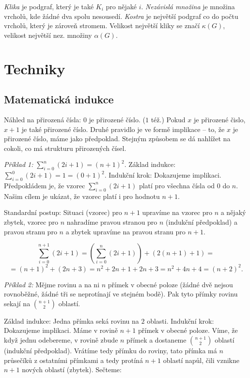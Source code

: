 {\it Klika} je podgraf, který je také $K_i$ pro nějaké $i$. {\it Nezávislá množina}
je množina vrcholů, kde žádné dva spolu nesousedí. {\it Kostra} je největší podgraf co
do počtu vrcholů, který je zároveň stromem. Velikost největší kliky se značí
$\kappa(G)$, velikost největší nez. množiny $\alpha(G)$.


\section{Techniky}

\subsection{Matematická indukce}

Náhled na přirozená čísla:
\itemize\ibull
\: $0$ je přirozené číslo. ($1$ též.)
\: Pokud $x$ je přirozené čislo, $x+1$ je také přirozené číslo.
\endlist
Druhé pravidlo je ve formě implikace -- to, že $x$ je přirozené číslo,
máme  jako předpoklad. Stejným způsobem se dá nahlížet na
cokoli, co má  strukturu přirozených čísel.

{\it Příklad 1:} $\sum_{i=0}^n (2i+1) = (n+1)^2$.
\itemize\ibull
\: Základ indukce: $\sum_{i=0}^0 (2i+1) = 1 = (0+1)^2$.
\: Indukční krok: Dokazujeme implikaci. Předpokládem je, že vzorec $\sum_{i=0}^n (2i+1)$ platí pro všechna čísla od $0$ do $n$. Našim cílem je ukázat, že vzorec platí i pro hodnotu $n+1$.

Standardní postup: Situaci (vzorec) pro $n+1$ upravíme na vzorec pro $n$ a nějaký zbytek,
vzorec pro $n$ nahradíme pravou stranou pro $n$ (indukční předpoklad) a pravou stranu pro $n$
a zbytek upravíme na pravou stranu pro $n+1$. 
\endlist

$$ \sum_{i=0}^{n+1} (2i+1) = \left( \sum_{i=0}^n (2i+1) \right) + \left(2(n+1)+1\right) = $$
$$ = (n+1)^2 + (2n+3) = n^2 + 2n +1 + 2n + 3 = n^2 + 4n + 4 = (n+2)^2. $$

{\it Příklad 2:} Mějme rovinu a na ni $n$ přímek v obecné poloze
(žádné dvě nejsou rovnoběžné, žádné tři se neprotínají ve stejném
bodě). Pak tyto přímky rovinu sekají na ${n+1 \choose 2}$ oblastí.

\itemize\ibull
\: Základ indukce: Jedna přímka seká rovinu na $2$ oblasti.
\: Indukční krok: Dokazujeme implikaci. Máme v rovině $n+1$ přímek v
obecné poloze. Víme, že když jednu odebereme, v rovině zbude $n$
přímek a dostaneme ${n+1 \choose 2}$ oblastí (indukční
předpoklad). Vrátíme tedy přímku do roviny, tato přímka má $n$
průsečíků z ostatními přímkami a tedy protíná $n+1$ oblastí napůl,
čili vznikne $n+1$ nových oblastí (zbytek). Sečteme:
\endlist


